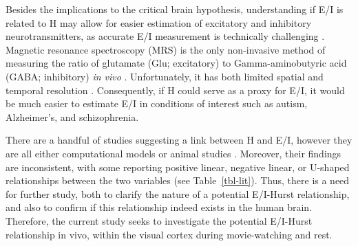 \documentclass[
true
]{sn-jnl}
\begin{document}
Besides the implications to the critical brain hypothesis, understanding
if E/I is related to H may allow for easier estimation of excitatory and
inhibitory neurotransmitters, as accurate E/I measurement is technically
challenging \citep{ajramContribution1HMagnetic2019}. Magnetic resonance
spectroscopy (MRS) is the only non-invasive method of measuring the
ratio of glutamate (Glu; excitatory) to Gamma-aminobutyric acid (GABA;
inhibitory) \emph{in vivo}
\citep{stanleyFunctionalMagneticResonance2018}. Unfortunately, it has
both limited spatial and temporal resolution
\citep{gaoInferringSynapticExcitation2017, ajramContribution1HMagnetic2019, stanleyFunctionalMagneticResonance2018}.
Consequently, if H could serve as a proxy for E/I, it would be much
easier to estimate E/I in conditions of interest such as autism,
Alzheimer's, and schizophrenia.

There are a handful of studies suggesting a link between H and E/I,
however they are all either computational models or animal studies
\citep{liangExcitationInhibitionBalance2024, poilCriticalStateDynamicsAvalanches2012, lombardiBalanceExcitationInhibition2017, baumgartenCriticalExcitationinhibitionBalance2019, bruiningMeasurementExcitationinhibitionRatio2020, trakoshisIntrinsicExcitationinhibitionImbalance, gaoInferringSynapticExcitation2017}.
Moreover, their findings are inconsistent, with some reporting positive
linear, negative linear, or U-shaped relationships between the two
variables (see Table~\ref{tbl-lit}). Thus, there is a need for further
study, both to clarify the nature of a potential E/I-Hurst relationship,
and also to confirm if this relationship indeed exists in the human
brain. Therefore, the current study seeks to investigate the potential
E/I-Hurst relationship in vivo, within the visual cortex during
movie-watching and rest.
\end{document}
